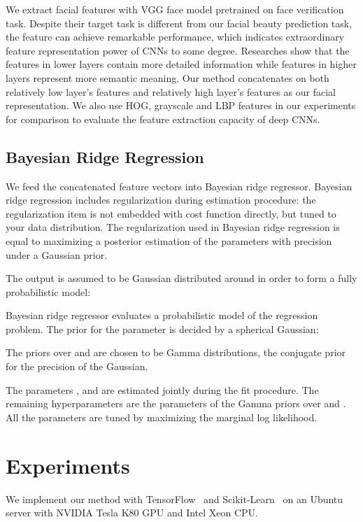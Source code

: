 \documentclass[a4paper,conference]{IEEEtran}
\begin{document}
    We extract facial features with VGG face model \cite{parkhi2015deep}
    pretrained on face verification task.
    Despite their target task is different from our facial
    beauty prediction task, the feature can achieve remarkable performance, which
    indicates extraordinary feature representation power of CNNs to some degree.
    Researches \cite{yosinski2014transferable} show that the features in lower
    layers contain more detailed information while features in higher layers
    represent more semantic meaning.
    Our method concatenates on
    both relatively low layer's features and relatively high layer's features as our
    facial representation.
    We also use HOG, grayscale and LBP features in our experiments for
    comparison to evaluate the feature extraction capacity of deep CNNs.

  \subsection{Bayesian Ridge Regression}
    We feed the concatenated feature vectors into Bayesian ridge regressor.
    Bayesian ridge regression includes regularization during estimation procedure:
    the regularization item is not embedded with cost function directly,
    but tuned to your data distribution. The 
    regularization used in Bayesian ridge regression is equal to maximizing
    a posterior estimation of the parameters 
    with precision  under a Gaussian prior.

    The output  is assumed to be Gaussian distributed around 
    in order to form a fully probabilistic model:

    

    Bayesian ridge regressor evaluates a probabilistic model of the regression
    problem. The prior for the parameter  is decided by a spherical Gaussian:
    

    The priors over  and  are chosen to be Gamma distributions,
    the conjugate prior for the precision of the Gaussian.

    The parameters ,  and  are estimated jointly during the
    fit procedure. The remaining hyperparameters are the parameters of the
    Gamma priors over  and .
    All the parameters are tuned by maximizing the marginal log likelihood.


\section{Experiments}
  We implement our method with TensorFlow~\cite{abadi2016tensorflow}
  and Scikit-Learn~\cite{pedregosa2011scikit} on an Ubuntu server with NVIDIA
  Tesla K80 GPU and Intel Xeon CPU.
\end{document}
